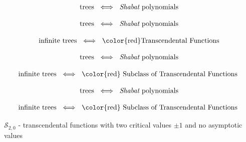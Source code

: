 \documentclass{beamer}
\begin{document}
\begin{frame}

\begin{align*} \text{trees }  \iff \text{ {\it Shabat} polynomials } \end{align*}

\end{frame}


\begin{frame}

\begin{align*} \text{trees }  \iff \text{ {\it Shabat} polynomials } \end{align*}

\vspace{5mm}

\begin{align*} \text{infinite trees }  \iff \text{ {\color{red}Transcendental Functions }} \end{align*}

\end{frame}


\begin{frame}

\begin{align*} \text{trees }  \iff \text{ {\it Shabat} polynomials } \end{align*}

\vspace{5mm}

\begin{align*} \text{infinite trees }  \iff \text{ {\color{red} Subclass of Transcendental Functions } } \end{align*}

\end{frame}


\begin{frame}

\begin{align*} \text{trees }  \iff \text{ {\it Shabat} polynomials } \end{align*}

\vspace{5mm}

\begin{align*} \text{infinite trees }  \iff \text{ {\color{red} Subclass of Transcendental Functions } } \end{align*}

{\color{red} $\mathcal{S}_{2,0}$ } - transcendental functions with two critical values $\pm 1$ and no {\color{red} asymptotic values}

\end{frame}
\end{document}
